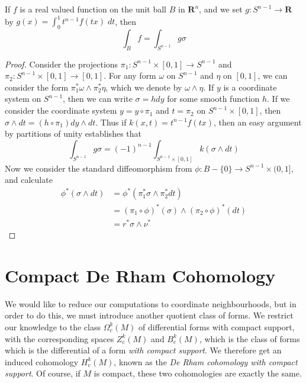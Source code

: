 \begin{corollary}
    If $f$ is a real valued function on the unit ball $B$ in $\mathbf{R}^n$, and we set $g: S^{n-1} \to \mathbf{R}$ by $g(x) = \int_0^1 t^{n-1} f(tx)\; dt$, then
    \[ \int_B f = \int_{S^{n-1}} g \sigma \]
\end{corollary}
\begin{proof}
    Consider the projections $\pi_1: S^{n-1} \times [0,1] \to S^{n-1}$ and $\pi_2: S^{n-1} \times [0,1] \to [0,1]$. For any form $\omega$ on $S^{n-1}$ and $\eta$ on $[0,1]$, we can consider the form $\pi_1^* \omega \wedge \pi_2^* \eta$, which we denote by $\omega \wedge \eta$. If $y$ is a coordinate system on $S^{n-1}$, then we can write $\sigma = h dy$ for some smooth function $h$. If we consider the coordinate system $y = y \circ \pi_1$ and $t = \pi_2$ on $S^{n-1} \times [0,1]$, then $\sigma \wedge dt = (h \circ \pi_1) dy \wedge dt$. Thus if $k(x,t) = t^{n-1} f(tx)$, then an easy argument by partitions of unity establishes that
    \[ \int_{S^{n-1}} g \sigma = (-1)^{n-1} \int_{S^{n-1} \times [0,1]} k (\sigma \wedge dt) \]
    Now we consider the standard diffeomorphism from $\phi: B - \{ 0 \} \to S^{n-1} \times (0,1]$, and calculate
    \begin{align*}
        \phi^*(\sigma \wedge dt) &= \phi^*(\pi_1^* \sigma \wedge \pi_2^* dt)\\
        &= (\pi_1 \circ \phi)^*(\sigma) \wedge (\pi_2 \circ \phi)^*(dt)\\
        &= r^* \sigma \wedge \nu^*
    \end{align*}
\end{proof}

\section{Compact De Rham Cohomology}

We would like to reduce our computations to coordinate neighbourhoods, but in order to do this, we must introduce another quotient class of forms. We restrict our knowledge to the class $\Omega^k_c(M)$ of differential forms with compact support, with the corresponding spaces $Z^k_c(M)$ and $B^k_c(M)$, which is the class of forms which is the differential of a form {\it with compact support}. We therefore get an induced cohomology $H^k_c(M)$, known as the \emph{De Rham cohomology with compact support}. Of course, if $M$ is compact, these two cohomologies are exactly the same.

